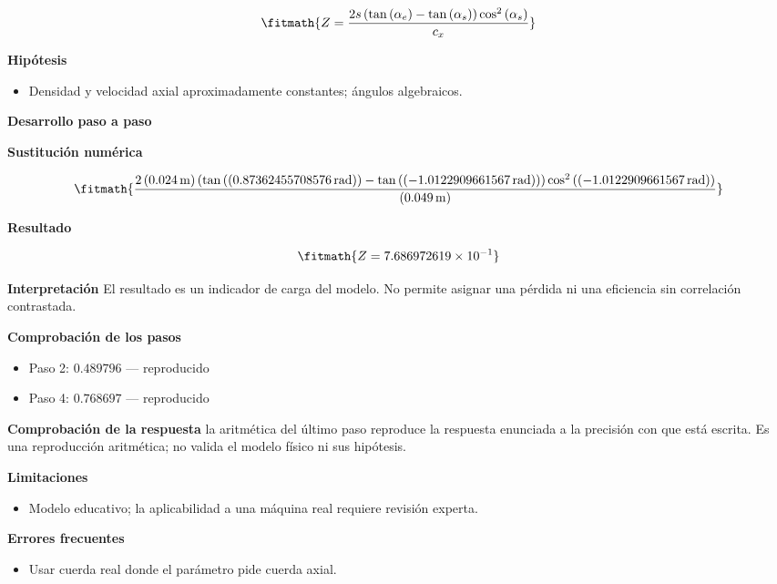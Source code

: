 \documentclass[10pt,openany]{book}
\begin{document}
\[
\fitmath{Z=\frac{2 s \left(\tan{\left(\alpha_e \right)} - \tan{\left(\alpha_s \right)}\right) \cos^{2}{\left(\alpha_s \right)}}{c_x}}
\]

\noindent\textbf{Hipótesis}
\begin{itemize}
\item Densidad y velocidad axial aproximadamente constantes; ángulos algebraicos.
\end{itemize}

\noindent\textbf{Desarrollo paso a paso}



\noindent\textbf{Sustitución numérica}

\[
\fitmath{\frac{2 \left(0.024\,\mathrm{m}\right) \left(\tan{\left(\left(0.87362455708576\,\mathrm{rad}\right) \right)} - \tan{\left(\left(-1.0122909661567\,\mathrm{rad}\right) \right)}\right) \cos^{2}{\left(\left(-1.0122909661567\,\mathrm{rad}\right) \right)}}{\left(0.049\,\mathrm{m}\right)}}
\]

\noindent\textbf{Resultado}

\[
\fitmath{Z=7.686972619\times10^{-1}}
\]

\noindent\textbf{Interpretación}
El resultado es un indicador de carga del modelo. No permite asignar una pérdida ni una eficiencia sin correlación contrastada.

\noindent\textbf{Comprobación de los pasos}
\begin{itemize}
\item Paso 2: $0.489796$ — reproducido
\item Paso 4: $0.768697$ — reproducido
\end{itemize}

\noindent\textbf{Comprobación de la respuesta} la aritmética del último paso reproduce la respuesta enunciada a la precisión con que está escrita. Es una reproducción aritmética; no valida el modelo físico ni sus hipótesis.

\noindent\textbf{Limitaciones}
\begin{itemize}
\item Modelo educativo; la aplicabilidad a una máquina real requiere revisión experta.
\end{itemize}

\noindent\textbf{Errores frecuentes}
\begin{itemize}
\item Usar cuerda real donde el parámetro pide cuerda axial.
\end{itemize}
\end{document}
